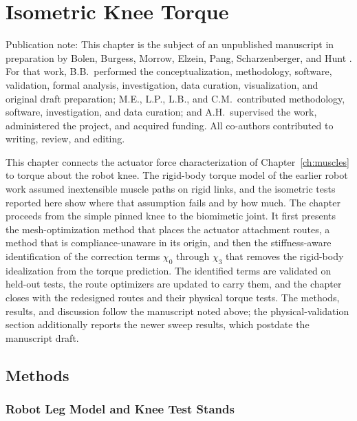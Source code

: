 \chapter{Isometric Knee Torque}\label{ch:torque}\label{ch:results}
\graphicspath{{../Figures/30-torque/}{figs/30-torque/}}

{\doublespacing\normalsize\upshape
\noindent Publication note: This chapter is the subject of an unpublished manuscript in preparation by Bolen, Burgess, Morrow, Elzein, Pang, Scharzenberger, and Hunt \citep{bolen_isometric_2025}. For that work, B.B.\ performed the conceptualization, methodology, software, validation, formal analysis, investigation, data curation, visualization, and original draft preparation; M.E., L.P., L.B., and C.M.\ contributed methodology, software, investigation, and data curation; and A.H.\ supervised the work, administered the project, and acquired funding. All co-authors contributed to writing, review, and editing.\par}

This chapter connects the actuator force characterization of Chapter~\ref{ch:muscles} to torque about the robot knee. The rigid-body torque model of the earlier robot work assumed inextensible muscle paths on rigid links, and the isometric tests reported here show where that assumption fails and by how much. The chapter proceeds from the simple pinned knee to the biomimetic joint. It first presents the mesh-optimization method that places the actuator attachment routes, a method that is compliance-unaware in its origin, and then the stiffness-aware identification of the correction terms $\chi_{0}$ through $\chi_{3}$ that removes the rigid-body idealization from the torque prediction. The identified terms are validated on held-out tests, the route optimizers are updated to carry them, and the chapter closes with the redesigned routes and their physical torque tests. The methods, results, and discussion follow the manuscript noted above; the physical-validation section additionally reports the newer sweep results, which postdate the manuscript draft.

\section{Methods}

\subsection{Robot Leg Model and Knee Test Stands}\label{sec:robot_model}


